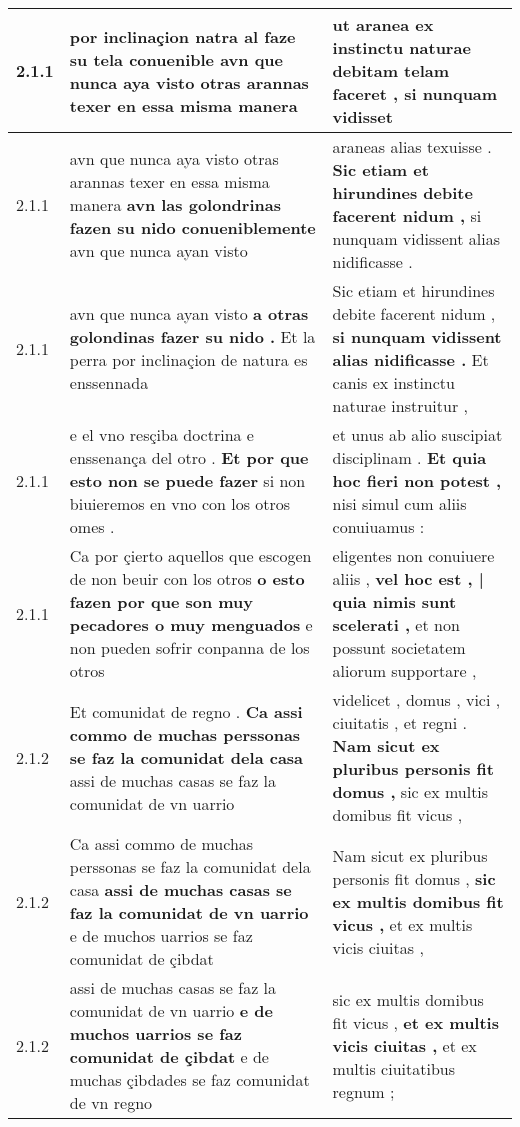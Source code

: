 \begin{tabular}{|p{1cm}|p{6.5cm}|p{6.5cm}|}
2.1.1 & por inclinaçion natra al \textbf{ faze su tela conuenible } avn que nunca aya visto otras arannas texer en essa misma manera & ut aranea ex instinctu naturae \textbf{ debitam telam faceret , } si nunquam vidisset \\\hline
2.1.1 & avn que nunca aya visto otras arannas texer en essa misma manera \textbf{ avn las golondrinas fazen su nido conueniblemente } avn que nunca ayan visto & araneas alias texuisse . \textbf{ Sic etiam et hirundines debite facerent nidum , } si nunquam vidissent alias nidificasse . \\\hline
2.1.1 & avn que nunca ayan visto \textbf{ a otras golondinas fazer su nido . } Et la perra por inclinaçion de natura es enssennada & Sic etiam et hirundines debite facerent nidum , \textbf{ si nunquam vidissent alias nidificasse . } Et canis ex instinctu naturae instruitur , \\\hline
2.1.1 & e el vno resçiba doctrina e enssenança del otro . \textbf{ Et por que esto non se puede fazer } si non biuieremos en vno con los otros omes . & et unus ab alio suscipiat disciplinam . \textbf{ Et quia hoc fieri non potest , } nisi simul cum aliis conuiuamus : \\\hline
2.1.1 & Ca por çierto aquellos que escogen de non beuir con los otros \textbf{ o esto fazen por que son muy pecadores o muy menguados } e non pueden sofrir conpanna de los otros & eligentes non conuiuere aliis , \textbf{ vel hoc est , | quia nimis sunt scelerati , } et non possunt societatem aliorum supportare , \\\hline
2.1.2 & Et comunidat de regno . \textbf{ Ca assi commo de muchas perssonas se faz la comunidat dela casa } assi de muchas casas se faz la comunidat de vn uarrio & videlicet , domus , vici , ciuitatis , et regni . \textbf{ Nam sicut ex pluribus personis fit domus , } sic ex multis domibus fit vicus , \\\hline
2.1.2 & Ca assi commo de muchas perssonas se faz la comunidat dela casa \textbf{ assi de muchas casas se faz la comunidat de vn uarrio } e de muchos uarrios se faz comunidat de çibdat & Nam sicut ex pluribus personis fit domus , \textbf{ sic ex multis domibus fit vicus , } et ex multis vicis ciuitas , \\\hline
2.1.2 & assi de muchas casas se faz la comunidat de vn uarrio \textbf{ e de muchos uarrios se faz comunidat de çibdat } e de muchas çibdades se faz comunidat de vn regno & sic ex multis domibus fit vicus , \textbf{ et ex multis vicis ciuitas , } et ex multis ciuitatibus regnum ; \\\hline

\end{tabular}

